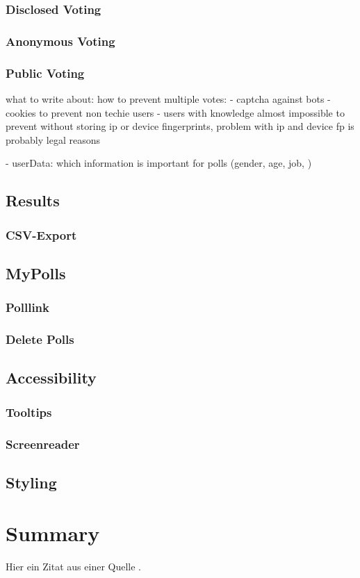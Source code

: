 \documentclass[a4paper,12pt]{report}
\begin{document}
\subsection{Disclosed Voting}
\subsection{Anonymous Voting}
\subsection{Public Voting}


what to write about:
how to prevent multiple votes: 
- 	captcha against bots 
-	cookies to prevent non techie users 
-	users with knowledge almost impossible to prevent without storing ip or device fingerprints, 
problem with ip and device fp is probably legal reasons

-	userData: which information is important for polls (gender, age, job, )

\section{Results}
\subsection{CSV-Export}
\section{MyPolls}
\subsection{Polllink}
\subsection{Delete Polls}
\section{Accessibility}
\subsection{Tooltips}
\subsection{Screenreader}
\section{Styling}
\chapter{Summary}
\lipsum[1]

Hier ein Zitat aus einer Quelle \cite{author2023example}.



\printbibliography

\listoffigures
\newpage
\end{document}
